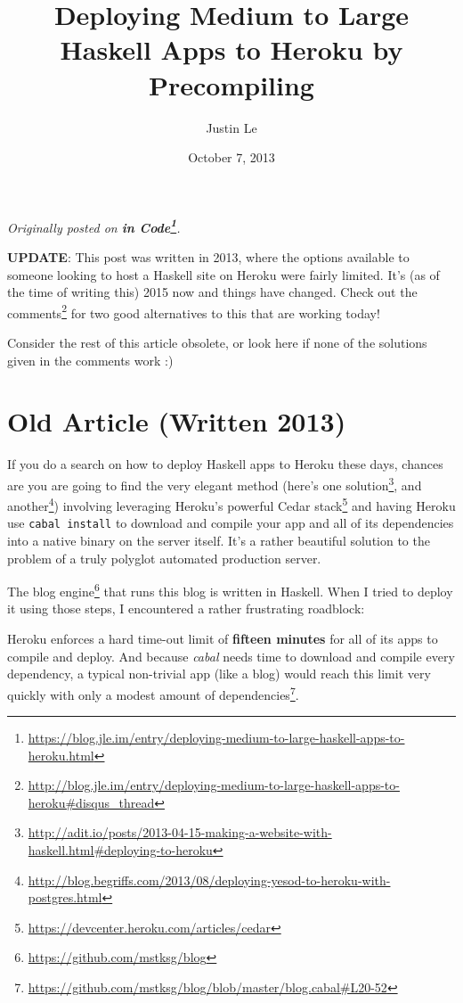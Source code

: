 \documentclass[]{article}
\title{Deploying Medium to Large Haskell Apps to Heroku by Precompiling}
\author{Justin Le}
\date{October 7, 2013}
\renewcommand{\href}[2]{#2\footnote{\url{#1}}}
\begin{document}
\maketitle

\emph{Originally posted on
\textbf{\href{https://blog.jle.im/entry/deploying-medium-to-large-haskell-apps-to-heroku.html}{in
Code}}.}

\textbf{UPDATE}: This post was written in 2013, where the options available to
someone looking to host a Haskell site on Heroku were fairly limited. It's (as
of the time of writing this) 2015 now and things have changed. Check out
\href{http://blog.jle.im/entry/deploying-medium-to-large-haskell-apps-to-heroku\#disqus_thread}{the
comments} for two good alternatives to this that are working today!

Consider the rest of this article obsolete, or look here if none of the
solutions given in the comments work :)

\hypertarget{old-article-written-2013}{%
\section{Old Article (Written 2013)}\label{old-article-written-2013}}

If you do a search on how to deploy Haskell apps to Heroku these days, chances
are you are going to find the very elegant method (here's
\href{http://adit.io/posts/2013-04-15-making-a-website-with-haskell.html\#deploying-to-heroku}{one
solution}, and
\href{http://blog.begriffs.com/2013/08/deploying-yesod-to-heroku-with-postgres.html}{another})
involving leveraging Heroku's powerful
\href{https://devcenter.heroku.com/articles/cedar}{Cedar stack} and having
Heroku use \texttt{cabal\ install} to download and compile your app and all of
its dependencies into a native binary on the server itself. It's a rather
beautiful solution to the problem of a truly polyglot automated production
server.

The \href{https://github.com/mstksg/blog}{blog engine} that runs this blog is
written in Haskell. When I tried to deploy it using those steps, I encountered a
rather frustrating roadblock:

Heroku enforces a hard time-out limit of \textbf{fifteen minutes} for all of its
apps to compile and deploy. And because \emph{cabal} needs time to download and
compile every dependency, a typical non-trivial app (like a blog) would reach
this limit very quickly with only a
\href{https://github.com/mstksg/blog/blob/master/blog.cabal\#L20-52}{modest
amount of dependencies}.
\end{document}
